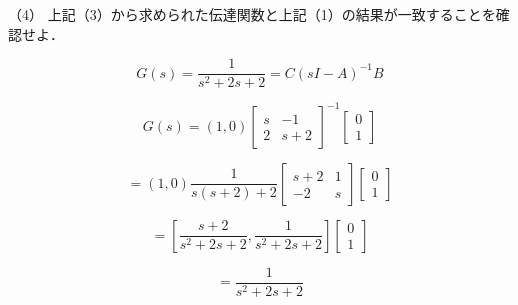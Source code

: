 \documentclass[xelatex,ja=standard,jafont=noto]{bxjsarticle}
\begin{document}
（4） 上記（3）から求められた伝達関数と上記（1）の結果が一致することを確認せよ．

\begin{equation}
G(s)=\frac{1}{s^{2}+2s+2}=C(sI-A)^{-1}B
	\end{equation}
	
	\begin{equation}
G(s)=(1,0){
\left[ \begin{array}{cc}
s & -1\\
2 & s+2
\end{array}
\right ]}^{-1}{
\left[ \begin{array}{c}
0 \\
1 
\end{array}
\right ]}
	\end{equation}
	
	\begin{equation}
=(1,0)\frac{1}{s(s+2)+2}{
\left[ \begin{array}{cc}
s+2 & 1\\
-2 & s
\end{array}
\right ]}{
\left[ \begin{array}{c}
0 \\
1 
\end{array}
\right ]}
	\end{equation}
	
	\begin{equation}
=[\frac{s+2}{s^{2}+2s+2},\frac{1}{s^{2}+2s+2}]
{
\left[ \begin{array}{c}
0 \\
1 
\end{array}
\right ]}
	\end{equation}
	
		\begin{equation}
=\frac{1}{s^{2}+2s+2}
	\end{equation}



	
	
\end{document}
